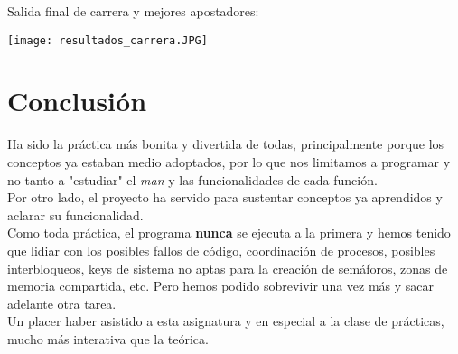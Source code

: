 \documentclass[12pt]{article}
\begin{document}
Salida final de carrera y mejores apostadores:
\begin{center}
	\texttt{[image: resultados\_carrera.JPG]}
\end{center}

\section{Conclusión}
Ha sido la práctica más bonita y divertida de todas, principalmente porque los conceptos ya estaban medio adoptados, por lo que nos limitamos a programar y no tanto a "estudiar" el \emph{man} y las funcionalidades de cada función.\\

Por otro lado, el proyecto ha servido para sustentar conceptos ya aprendidos y aclarar su funcionalidad.\\

Como toda práctica, el programa \textbf{nunca} se ejecuta a la primera y hemos tenido que lidiar con los posibles fallos de código, coordinación de procesos, posibles interbloqueos, keys de sistema no aptas para la creación de semáforos, zonas de memoria compartida, etc. Pero hemos podido sobrevivir una vez más y sacar adelante otra tarea.\\

Un placer haber asistido a esta asignatura y en especial a la clase de prácticas, mucho más interativa que la teórica.
\end{document}
